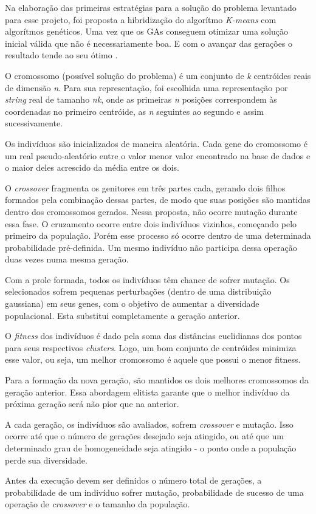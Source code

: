 Na elaboração das primeiras estratégias para a solução do problema levantado para esse 
projeto, foi proposta a hibridização do algorítmo {\it K-means} com algorítmos genéticos. Uma vez que os GAs conseguem otimizar uma solução inicial válida que não é necessariamente boa. E com o avançar das gerações o resultado tende ao seu ótimo \cite{ga_based_clustering_technique}.

O cromossomo (possível solução do problema) é um conjunto de {\it k} centróides reais de dimensão {\it n}. Para sua representação, foi escolhida uma representação por {\it string} real de tamanho {\it nk}, onde as primeiras {\it n} posições correspondem às coordenadas no primeiro centróide, as {\it n} seguintes ao segundo e assim sucessivamente.

Os indivíduos são inicializados de maneira aleatória. Cada gene do cromossomo é um real pseudo-aleatório entre o valor menor valor encontrado na base de dados e o maior deles acrescido da média entre os dois.

O {\it crossover} fragmenta os genitores em três partes cada, gerando dois filhos formados pela combinação dessas partes, de modo que suas posições são mantidas dentro dos cromossomos gerados. Nessa proposta, não ocorre mutação durante essa fase. O cruzamento ocorre entre dois indivíduos vizinhos, começando pelo primeiro da população.
Porém esse processo só ocorre dentro de uma determinada probabilidade pré-definida. Um mesmo indivíduo não participa dessa operação duas vezes numa mesma geração.

Com a prole formada, todos os indivíduos têm chance de sofrer mutação. Os selecionados sofrem pequenas perturbações (dentro de uma distribuição gaussiana) em seus genes, com o objetivo de aumentar a diversidade populacional. Esta substitui completamente a geração anterior.

O {\it fitness} dos indivíduos é dado pela soma das distâncias euclidianas dos pontos para seus respectivos {\it clusters}. Logo, um bom conjunto de centróides minimiza esse valor, ou seja, um melhor cromossomo é aquele que possui o menor fitness.

Para a formação da nova geração, são mantidos os dois melhores cromossomos da geração anterior. Essa abordagem elitista garante que o melhor indivíduo da próxima geração será não pior que na anterior.

A cada geração, os indivíduos são avaliados, sofrem {\it crossover} e mutação. Isso ocorre até que o número de gerações desejado seja atingido, ou até que um determinado grau de homogeneidade seja atingido - o ponto onde a população perde sua diversidade.

Antes da execução devem ser definidos o número total de gerações, a probabilidade de um indivíduo sofrer mutação, probabilidade de sucesso de uma operação de {\it crossover} e o tamanho da população.